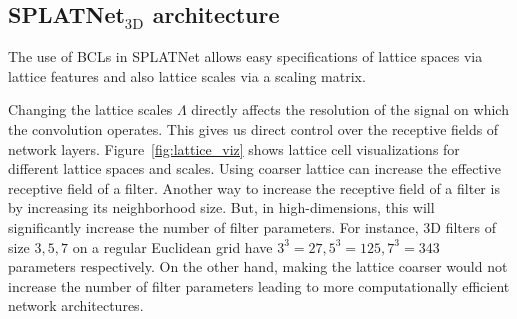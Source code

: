 \documentclass[10pt,twocolumn,letterpaper]{article}
\begin{document}
\subsection{SPLATNet$_{\text{3D}}$ architecture}%
The use of BCLs in SPLATNet allows easy specifications of lattice spaces via lattice features and also lattice scales via a scaling matrix.

Changing the lattice scales $\Lambda$ directly affects the resolution of the signal on which the convolution operates. This gives us direct control over the receptive fields of network layers.
Figure~\ref{fig:lattice_viz} shows lattice cell visualizations for different lattice spaces and scales.
Using coarser lattice can increase the effective receptive field of a filter.
Another way to increase the receptive field of a filter is by increasing its neighborhood size. 
But, in high-dimensions, this will significantly increase the number of filter parameters. For instance, 3D filters of size $3, 5, 7$ on a regular Euclidean grid have $3^3=27, 5^3=125, 7^3=343$ parameters respectively.
On the other hand, 
making the lattice coarser would not increase the number of filter parameters leading to more computationally efficient network architectures.
\end{document}
